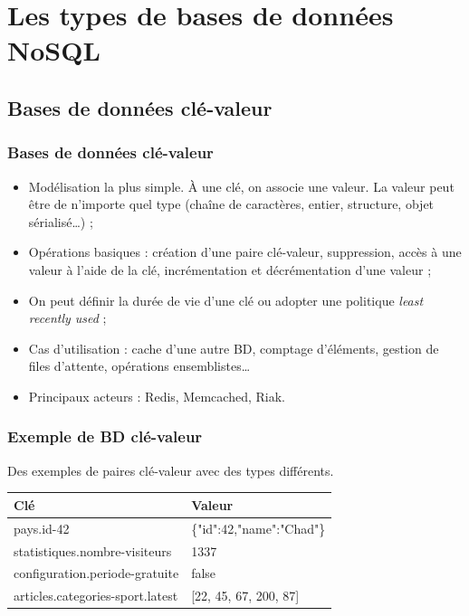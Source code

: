 \section{Les types de bases de données NoSQL}

	\subsection{Bases de données clé-valeur}
	\begin{frame}
		\frametitle{Bases de données clé-valeur}

		\begin{itemize}
			\item Modélisation la plus simple. À une clé, on associe une valeur. La valeur peut être de n'importe quel type (chaîne de caractères, entier, structure, objet sérialisé\dots) ;
			\item Opérations basiques : création d'une paire clé-valeur, suppression, accès à une valeur à l'aide de la clé, incrémentation et décrémentation d'une valeur ;
			\item On peut définir la durée de vie d'une clé ou adopter une politique \textit{least recently used} ;
			\item Cas d'utilisation : cache d'une autre BD, comptage d'éléments, gestion de files d'attente, opérations ensemblistes\dots
			\item Principaux acteurs : Redis, Memcached, Riak.
		\end{itemize}

	\end{frame}

	\begin{frame}
		\frametitle{Exemple de BD clé-valeur}

		Des exemples de paires clé-valeur avec des types différents.
		\vspace{15px}

		\begin{tabular}{|l|l|}
			\hline
			\textbf{Clé} & \textbf{Valeur} \\ \hline\hline
			pays.id-42 & \{"id":42,"name":"Chad"\} \\ \hline
			statistiques.nombre-visiteurs & 1337 \\ \hline
			configuration.periode-gratuite & false \\ \hline
			articles.categories-sport.latest & [22, 45, 67, 200, 87] \\ \hline
		\end{tabular}

	\end{frame}

